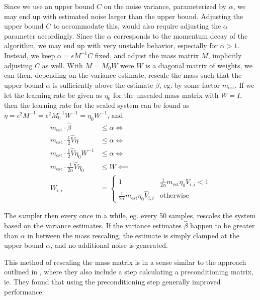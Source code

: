 Since we use an upper bound $C$ on the noise variance, parameterized by $\alpha$, we may end up with estimated noise larger than the upper bound.
Adjusting the upper bound $C$ to accommodate this, would also require adjusting the $\alpha$ parameter accordingly.
Since the $\alpha$ corresponds to the momentum decay of the algorithm, we may end up with very unstable behavior, especially for $\alpha > 1$. 
Instead, we keep $\alpha=\epsilon M^{-1}C$ fixed, and adjust the mass matrix $M$, implicitly adjusting $C$ as well.
With $M = M_0 W$ were $W$ is a diagonal matrix of weights, we can then, depending on the variance estimate, rescale the mass such that the upper bound $\alpha$ is sufficiently above the estimate $\hat\beta$, eg. by some factor $m_{\text{est}}$.
If we let the learning rate be given as $\eta_0$  for the unscaled mass matrix with $W = I$, then the learning rate for the scaled system can be found as $\eta = \epsilon^2 M^{-1} = \epsilon^2 M_0^{-1}W^{-1} = \eta_0 W^{-1}$, and
\begin{align}
    m_{\text{est}} \cdot \hat{\beta}  &\leq \alpha \Leftrightarrow\\ 
    m_{\text{est}} \cdot \frac{1}{2} \hat V \eta   &\leq \alpha \Leftrightarrow\\ 
    m_{\text{est}} \cdot \frac{1}{2} \hat V \eta_0 W^{-1}  &\leq \alpha \Leftrightarrow\\ 
    m_{\text{est}} \cdot \frac{1}{2\alpha} \hat V \eta_0   &\leq W \impliedby \\
    W_{i,i} &= \begin{cases}
        1 & \frac{1}{2\alpha}m_{\text{est}} \eta_0 \hat{V}_{i,i} < 1 \\
        \frac{1}{2\alpha}m_{\text{est}} \eta_0 \hat{V}_{i,i} & \text{otherwise}
    \end{cases}
\end{align}

The sampler then every once in a while, eg. every 50 samples, rescales the system based on the variance estimates.
If the variance estimates $\hat \beta$ happen to be greater than $\alpha$ in between the mass rescaling, the estimate is simply clamped at the upper bound $\alpha$, and no additional noise is generated.  

This method of rescaling the mass matrix is in a sense similar to the approach outlined in \cite{wenzel_how_2020}, where they also include a step calculating a preconditioning matrix, ie.
They found that using the preconditioning step generally improved performance.

